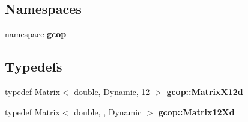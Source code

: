 \subsection*{\-Namespaces}
\begin{DoxyCompactItemize}
\item 
namespace {\bf gcop}
\end{DoxyCompactItemize}
\subsection*{\-Typedefs}
\begin{DoxyCompactItemize}
\item 
typedef \-Matrix$<$ double, \*
\-Dynamic, 12 $>$ {\bf gcop\-::\-Matrix\-X12d}
\item 
typedef \-Matrix$<$ double, , \-Dynamic $>$ {\bf gcop\-::\-Matrix12\-Xd}
\end{DoxyCompactItemize}
